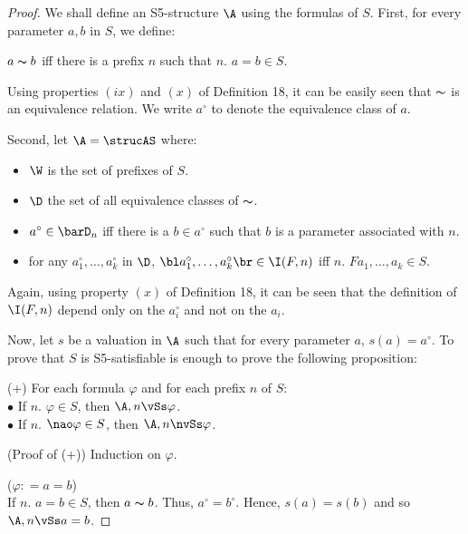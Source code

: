 \begin{proof}
We shall define an S5-structure $\A$ using the formulas of $S$. First, for every parameter $a,b$ in $S$, we define:

\begin{center}
$a \thicksim b$ iff there is a prefix $n$ such that $n.$ $a=b \in S$.
\end{center}

\qquad Using properties $(ix)$ and $(x)$ of Definition 18, it can be easily seen that $\thicksim$ is an equivalence relation. We write $a^{\circ}$ to denote the equivalence class of $a$. 

\qquad Second, let $\A = \strucAS$ where:


\begin{itemize}
\item $\W$ is the set of prefixes of $S$.
\item $\D$ the set of all equivalence classes of $\thicksim$.
\item $a^{\circ} \in \barD_{n}$ iff there is a $b \in a^{\circ}$ such that $b$ is a parameter associated with $n$.
\item for any $a_1^{\circ}, \dots, a_k^{\circ}$ in $\D$, $\bl a_1^{\circ}, \dots, a_k^{\circ} \br \in \I(F,n)$ iff $n.$  $Fa_1, \dots, a_k \in S$.
\end{itemize}

\qquad Again, using property $(x)$ of Definition 18, it can be seen that the definition of $\I(F,n)$ depend only on the $a_i^{\circ}$ and not on the $a_i$.

\qquad Now, let $s$ be a valuation in $\A$ such that for every parameter $a$, $s(a)= a^{\circ}$. To prove that $S$ is S5-satisfiable is enough to prove the following proposition:


\begin{center}
(+) For each formula $\varphi$ and for each prefix $n$ of $S$:\\
$\bullet$ If $n.$ $\varphi \in S$, then $\A,n \vSs \varphi$. \\
$\bullet$ If $n.$ $\nao \varphi \in S$, then $\A,n \nvSs \varphi$.
\end{center}

\qquad (Proof of (+)) Induction on $\varphi$.
\vspace{10mm}




($\varphi : = a=b$)\\
\qquad If $n.$ $a=b \in S$, then $a\thicksim b$. Thus, $a^{\circ} = b^{\circ}$. Hence, $s(a)=s(b)$ and so $\A,n \vSs a=b$. 


\end{proof}
